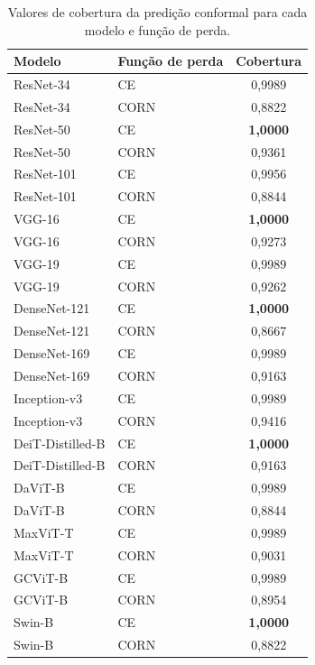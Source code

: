\begin{table}[!htbp]
    \centering
    \begin{tabular}{|l|l|c|}
        \hline
        \textbf{Modelo} & \textbf{Função de perda} & \textbf{Cobertura} \\
        \hline
        ResNet-34 & CE &    0,9989 \\
        \hline
        ResNet-34 & CORN &    0,8822 \\
        \hline
        ResNet-50 & CE &    \textbf{1,0000} \\
        \hline
        ResNet-50 & CORN &    0,9361 \\
        \hline
        ResNet-101 & CE &    0,9956 \\
        \hline
        ResNet-101 & CORN &    0,8844 \\
        \hline
        VGG-16 & CE &    \textbf{1,0000} \\
        \hline
        VGG-16 & CORN &    0,9273 \\
        \hline
        VGG-19 & CE &    0,9989 \\
        \hline
        VGG-19 & CORN &    0,9262 \\
        \hline
        DenseNet-121 & CE &    \textbf{1,0000} \\
        \hline
        DenseNet-121 & CORN &    0,8667 \\
        \hline
        DenseNet-169 & CE &    0,9989 \\
        \hline
        DenseNet-169 & CORN &    0,9163 \\
        \hline
        Inception-v3 & CE &    0,9989 \\
        \hline
        Inception-v3 & CORN &    0,9416 \\
        \hline
        DeiT-Distilled-B & CE &    \textbf{1,0000} \\
        \hline
        DeiT-Distilled-B & CORN &    0,9163 \\
        \hline
        DaViT-B & CE &    0,9989 \\
        \hline
        DaViT-B & CORN &    0,8844 \\
        \hline
        MaxViT-T & CE &    0,9989 \\
        \hline
        MaxViT-T & CORN &    0,9031 \\
        \hline
        GCViT-B & CE &    0,9989 \\
        \hline
        GCViT-B & CORN &    0,8954 \\
        \hline
        Swin-B & CE &    \textbf{1,0000} \\
        \hline
        Swin-B & CORN &    0,8822 \\
        \hline
    \end{tabular}
    \caption{Valores de cobertura da predição conformal para cada modelo e função de perda.}
    \label{tab:conformal_coverage}
\end{table}

